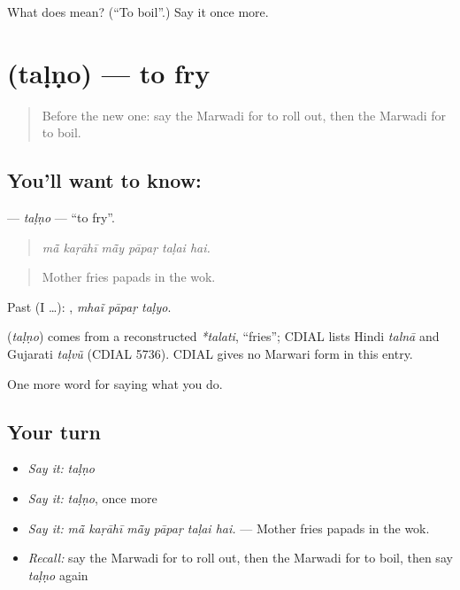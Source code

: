 \begin{tcolorbox}[breakable,colback=teal!4,colframe=teal!35!black,title={Before you move on}]
What does  mean? (\textquotedblleft{}To boil\textquotedblright{}.) Say it once more.
\end{tcolorbox}
\section[\texorpdfstring{\mw{तळणो} (taḷṇo)}{तळणो (taḷṇo)}]{ (taḷṇo) — to fry}

\label{lesson:MW-C169-talno}



\begin{quote}
Before the new one: say the Marwadi for to roll out, then the Marwadi for to boil.
\end{quote}

\subsection*{You'll want to know: }
\textbf{} — \emph{taḷṇo} — \textquotedblleft{}to fry\textquotedblright{}.

\begin{quote}
     
\end{quote}

\begin{quote}
\emph{mā̃ kaṛāhī mā̃y pāpaṛ taḷai hai.}
\end{quote}

\begin{quote}
Mother fries papads in the wok.
\end{quote}

Past (I …):   , \emph{mhaĩ pāpaṛ taḷyo}.

\begin{cousinweb}
\textbf{} (\emph{taḷṇo}) comes from a reconstructed \emph{*talati}, \textquotedblleft{}fries\textquotedblright{}; CDIAL lists Hindi \emph{talnā} and Gujarati \emph{taḷvũ} (CDIAL 5736). CDIAL gives no Marwari form in this entry.
\end{cousinweb}

\begin{grammarlens}[title={What you've built}]
One more word for saying what you do.
\end{grammarlens}

\subsection*{Your turn}
\begin{itemize}
\raggedright
  \item \emph{Say it:} \emph{taḷṇo}
  \item \emph{Say it:} \emph{taḷṇo}, once more
  \item \emph{Say it:} \emph{mā̃ kaṛāhī mā̃y pāpaṛ taḷai hai.} — Mother fries papads in the wok.
  \item \emph{Recall:} say the Marwadi for to roll out, then the Marwadi for to boil, then say \emph{taḷṇo} again
\end{itemize}

